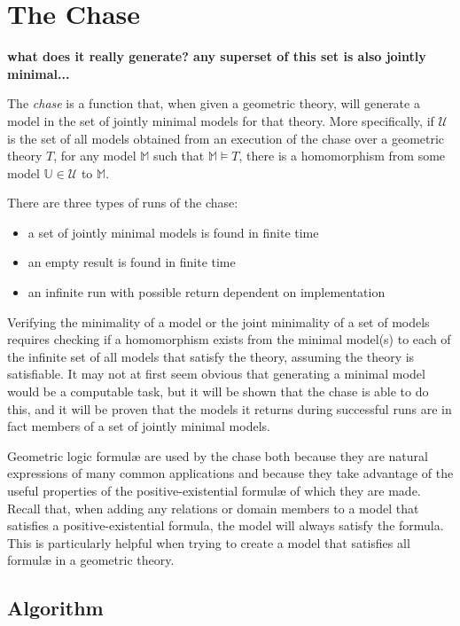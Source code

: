 \section{The Chase}
\label{sec:chase}

	\textbf{ what does it really generate? any superset of this set is also jointly minimal... }

	The \emph{chase} is a function that, when given a geometric theory, will
	generate a model in the set of jointly minimal models for that theory. More
	specifically, if $\mathcal{U}$ is the set of all models obtained from an
	execution of the chase over a geometric theory $T$, for any model
	$\mathbb{M}$ such that $\mathbb{M} \models T$, there is a homomorphism from
	some model $\mathbb{U} \in \mathcal{U}$ to $\mathbb{M}$.

	There are three types of runs of the chase:
	\begin{itemize}
	\item a set of jointly minimal models is found in finite time
	\item an empty result is found in finite time
	\item an infinite run with possible return dependent on implementation
	\end{itemize}

	Verifying the minimality of a model or the joint minimality of a set of
	models requires checking if a homomorphism exists from the minimal model(s)
	to each of the infinite set of all models that satisfy the theory, assuming
	the theory is satisfiable. It may not at first seem obvious that generating
	a minimal model would be a computable task, but it will be shown that the
	chase is able to do this, and it will be proven that the models it returns
	during successful runs are in fact members of a set of jointly minimal
	models.

	Geometric logic formul{\ae} are used by the chase both because they are
	natural expressions of many common applications and because they take
	advantage of the useful properties of the positive-existential formul{\ae}
	of which they are made.  Recall that, when adding any relations or domain
	members to a model that satisfies a positive-existential formula, the model
	will always satisfy the formula. This is particularly helpful when trying
	to create a model that satisfies all formul{\ae} in a geometric theory.

	\subsection{Algorithm}
	\label{sec:chase.algorithm}


